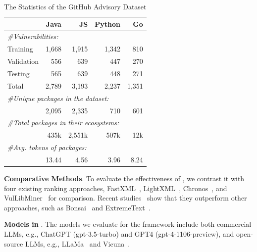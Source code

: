 \begin{table}[t]
\centering
\caption{The Statistics of the GitHub Advisory Dataset}
\label{tab: dataset info}
\begin{threeparttable}
\small
\begin{tabular}{lrrrr}
\toprule
           & Java & JS   & Python & Go   \\
\midrule
\multicolumn{5}{l}{\textit{\#Vulnerabilities:}}     \\
Training   & 1,668 & 1,915 & 1,342   & 810   \\
Validation & 556   & 639   & 447     & 270   \\
Testing    & 565   & 639   & 448     & 271   \\
Total      & 2,789 & 3,193 & 2,237   & 1,351 \\
\midrule
\multicolumn{5}{l}{\textit{\#Unique packages in the dataset:}}    \\
      & 2,095 & 2,335 & 710     & 601   \\ 
\multicolumn{5}{l}{\textit{\#Total packages in their ecosystems:}}    \\
      & 435k & 2,551k & 507k     & 12k   \\ 
\midrule
\multicolumn{5}{l}{\textit{\#Avg. tokens of packages:}}    \\
& 13.44 & 4.56  & 3.96    & 8.24 \\
\bottomrule
\end{tabular}
\end{threeparttable}
\vspace{-0.3cm}
\end{table}


\noindent \textbf{Comparative Methods}. To evaluate the effectiveness of \detector{}, we contrast it with four existing ranking approaches, FastXML~\cite{fastxml}, LightXML~\cite{lightxml}, Chronos~\cite{chronos}, and VulLibMiner~\cite{vullibminer} for comparison.
Recent studies~\cite{chronos, vullibminer} show that they outperform other approaches, such as Bonsai~\cite{khandagale2020bonsai} and ExtremeText~\cite{wydmuch2018no}.

\noindent \textbf{Models in \detector{}}. The models we evaluate for the \detector{} framework include both commercial LLMs, e.g., ChatGPT (gpt-3.5-turbo) and GPT4 (gpt-4-1106-preview), and open-source LLMs, e.g., LLaMa~\cite{llama} and Vicuna~\cite{vicuna}.


